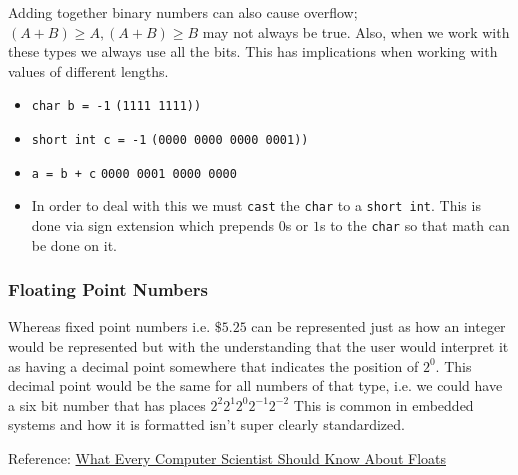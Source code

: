 \documentclass[10pt]{article}
\begin{document}
Adding together binary numbers can also cause overflow; $ (A+B) \ge A, (A+B) \ge  B $ may not always be true.
Also, when we work with these types we always use all the bits. This has implications when working with values of different lengths.

\begin{itemize}
	\item \texttt{char b = -1}  \texttt{(1111 1111))}
	\item \texttt{short int c = -1}  \texttt{(0000 0000 0000 0001))}
	\item \texttt{a = b + c} \texttt{0000 0001 0000 0000 } 
	\item In order to deal with this we must \texttt{cast} the \texttt{char} to a \texttt{short int}. This is done via sign extension which prepends $ 0 $s or $ 1 $s  to the \texttt{char} so that math can be done on it.
\end{itemize}


\subsubsection{Floating Point Numbers}


Whereas fixed point numbers i.e. $ \$5.25 $ can be represented just as how an integer would be represented but with the understanding that the user would interpret it as having a decimal point somewhere that indicates the position of $ 2^0 $.
This decimal point would be the same for all numbers of that type, i.e. we could have a six bit number that has places $ 2^2 2^1 2^0 2^{-1} 2^{-2} $ 
This is common in embedded systems and how it is formatted isn't super clearly standardized.

\begin{lemma}
	Reference: \href{https://www.eecg.utoronto.ca/~moshovos/ECE352-2022/00.practice/What\%20Every\%20Computer\%20Scientist\%20Should\%20Know\%20About\%20Floating-Point\%20Arithmetic.htm}{What Every Computer Scientist Should Know About Floats}
\end{lemma}
\end{document}
